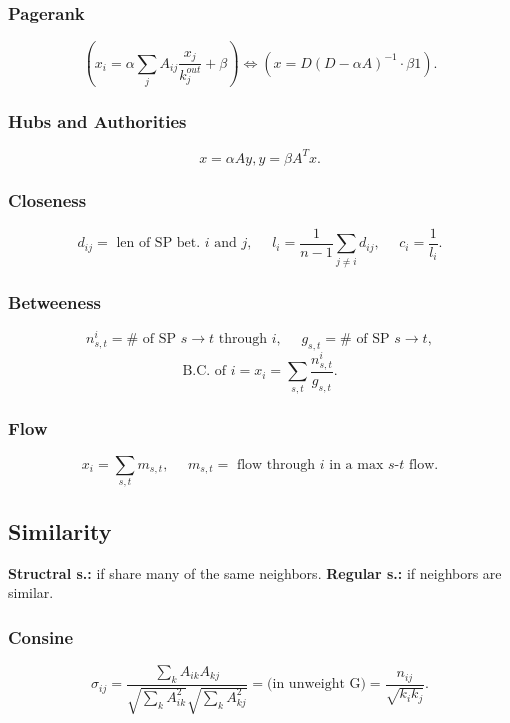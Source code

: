 \documentclass[a4paper,twocolumn,10pt]{article}
\newcommand{\pte}[1]{\left({#1}\right)}
\begin{document}
	\subsubsection{Pagerank}
		\[
			\pte{x_i = \alpha \sum_j A_{ij} \frac{x_j}{k_j^{out}} + \beta}
			\Longleftrightarrow
			\pte{x=D(D-\alpha A)^{-1}\cdot \beta1}.
		\]
	
	\subsubsection{Hubs and Authorities}
		\[
			x=\alpha A y, y=\beta A^T x.
		\]

	\subsubsection{Closeness}
		\[
			d_{ij}=\textrm{ len of SP bet. $i$ and $j$},
			\textrm{~~~~}
			l_i=\frac{1}{n-1} \sum_{j\neq i} d_{ij},
			\textrm{~~~~}
			c_i=\frac{1}{l_i}.
		\]
		
	\subsubsection{Betweeness}
		\[
			n_{s,t}^i=\#\textrm{ of SP $s\to t$ through $i$},
			\textrm{~~~~}
			g_{s,t}=\#\textrm{ of SP $s\to t$},
		\] \[
			\textrm{B.C. of $i$}=x_i=\sum_{s,t} \frac{n_{s,t}^i}{g_{s,t}}.
		\]

	\subsubsection{Flow}
		\[
			x_i = \sum_{s,t} m_{s,t},
			\textrm{~~~~}
			m_{s,t}=\textrm{ flow through $i$ in a max $s$-$t$ flow}.
		\]

\subsection{Similarity}
	\textbf{Structral s.:} if share many of the same neighbors.
	\textbf{Regular s.:} if neighbors are similar.

	\subsubsection{Consine}
		\[
			\sigma_{ij} = \frac{\sum_k A_{ik} A_{kj}} {\sqrt{\sum_k A_{ik}^2}\sqrt{\sum_k A_{kj}^2}}
			=\textrm{(in unweight G)}=\frac{n_{ij}}{\sqrt{k_i k_j}}.
		\]
\end{document}
